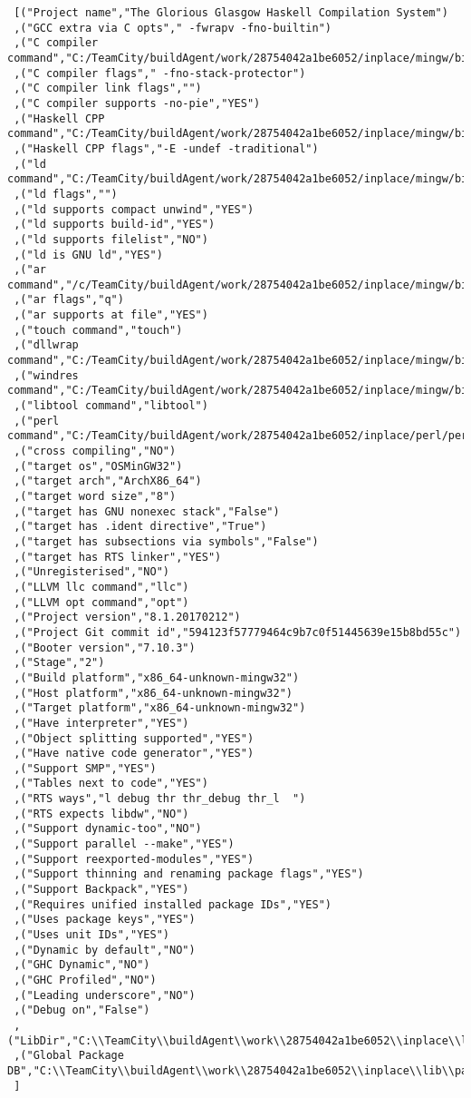 \begin{verbatim}
 [("Project name","The Glorious Glasgow Haskell Compilation System")
 ,("GCC extra via C opts"," -fwrapv -fno-builtin")
 ,("C compiler command","C:/TeamCity/buildAgent/work/28754042a1be6052/inplace/mingw/bin/gcc.exe")
 ,("C compiler flags"," -fno-stack-protector")
 ,("C compiler link flags","")
 ,("C compiler supports -no-pie","YES")
 ,("Haskell CPP command","C:/TeamCity/buildAgent/work/28754042a1be6052/inplace/mingw/bin/gcc.exe")
 ,("Haskell CPP flags","-E -undef -traditional")
 ,("ld command","C:/TeamCity/buildAgent/work/28754042a1be6052/inplace/mingw/bin/ld.exe")
 ,("ld flags","")
 ,("ld supports compact unwind","YES")
 ,("ld supports build-id","YES")
 ,("ld supports filelist","NO")
 ,("ld is GNU ld","YES")
 ,("ar command","/c/TeamCity/buildAgent/work/28754042a1be6052/inplace/mingw/bin/ar")
 ,("ar flags","q")
 ,("ar supports at file","YES")
 ,("touch command","touch")
 ,("dllwrap command","C:/TeamCity/buildAgent/work/28754042a1be6052/inplace/mingw/bin/dllwrap.exe")
 ,("windres command","C:/TeamCity/buildAgent/work/28754042a1be6052/inplace/mingw/bin/windres.exe")
 ,("libtool command","libtool")
 ,("perl command","C:/TeamCity/buildAgent/work/28754042a1be6052/inplace/perl/perl")
 ,("cross compiling","NO")
 ,("target os","OSMinGW32")
 ,("target arch","ArchX86_64")
 ,("target word size","8")
 ,("target has GNU nonexec stack","False")
 ,("target has .ident directive","True")
 ,("target has subsections via symbols","False")
 ,("target has RTS linker","YES")
 ,("Unregisterised","NO")
 ,("LLVM llc command","llc")
 ,("LLVM opt command","opt")
 ,("Project version","8.1.20170212")
 ,("Project Git commit id","594123f57779464c9b7c0f51445639e15b8bd55c")
 ,("Booter version","7.10.3")
 ,("Stage","2")
 ,("Build platform","x86_64-unknown-mingw32")
 ,("Host platform","x86_64-unknown-mingw32")
 ,("Target platform","x86_64-unknown-mingw32")
 ,("Have interpreter","YES")
 ,("Object splitting supported","YES")
 ,("Have native code generator","YES")
 ,("Support SMP","YES")
 ,("Tables next to code","YES")
 ,("RTS ways","l debug thr thr_debug thr_l  ")
 ,("RTS expects libdw","NO")
 ,("Support dynamic-too","NO")
 ,("Support parallel --make","YES")
 ,("Support reexported-modules","YES")
 ,("Support thinning and renaming package flags","YES")
 ,("Support Backpack","YES")
 ,("Requires unified installed package IDs","YES")
 ,("Uses package keys","YES")
 ,("Uses unit IDs","YES")
 ,("Dynamic by default","NO")
 ,("GHC Dynamic","NO")
 ,("GHC Profiled","NO")
 ,("Leading underscore","NO")
 ,("Debug on","False")
 ,("LibDir","C:\\TeamCity\\buildAgent\\work\\28754042a1be6052\\inplace\\lib")
 ,("Global Package DB","C:\\TeamCity\\buildAgent\\work\\28754042a1be6052\\inplace\\lib\\package.conf.d")
 ]
\end{verbatim}
